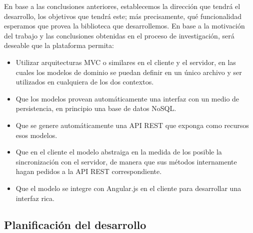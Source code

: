 \documentclass[doc,helv,longtable]{article}
\begin{document}
En base a las conclusiones anteriores, establecemos la dirección que tendrá el desarrollo, los objetivos que tendrá este; más precisamente, qué funcionalidad esperamos que provea la biblioteca que desarrollemos. En base a la motivación del trabajo y las conclusiones obtenidas en el proceso de investigación, será deseable que la plataforma permita:
\begin{itemize}
\item  Utilizar arquitecturas MVC o similares en el cliente y el servidor, en las cuales los modelos de dominio se puedan definir en un único archivo y ser utilizados en cualquiera de los dos contextos.
\item  Que los modelos provean automáticamente una interfaz con un medio de persistencia, en principio una base de datos NoSQL.
\item  Que se genere automáticamente una API REST que exponga como recursos esos modelos.
\item  Que en el cliente el modelo abstraiga en la medida de los posible la sincronización con el servidor, de manera que sus métodos internamente hagan pedidos a la API REST correspondiente.
\item  Que el modelo se integre con Angular.js en el cliente para desarrollar una interfaz rica.

\end{itemize}
\subsection{Planificación del desarrollo}
\end{document}
